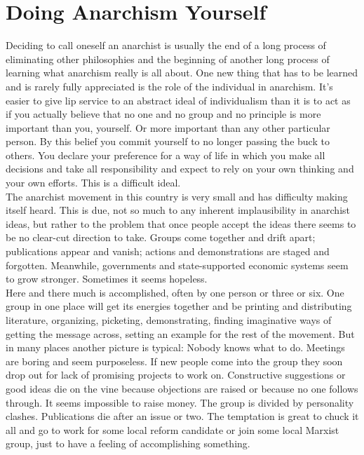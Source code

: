 \chapter{Doing Anarchism Yourself}

Deciding to call oneself an anarchist is usually the end of a long process of eliminating other philosophies and the beginning of another long process of learning what anarchism really is all about. One new thing that has to be learned and is rarely fully appreciated is the role of the individual in anarchism. It's easier to give lip service to an abstract ideal of individualism than it is to act as if you actually believe that no one and no group and no principle is more important than you, yourself. Or more important than any other particular person. By this belief you commit yourself to no longer passing the buck to others. You declare your preference for a way of life in which you make all decisions and take all responsibility and expect to rely on your own thinking and your own efforts. This is a difficult ideal.\\
The anarchist movement in this country is very small and has difficulty making itself heard. This is due, not so much to any inherent implausibility in anarchist ideas, but rather to the problem that once people accept the ideas there seems to be no clear-cut direction to take. Groups come together and drift apart; publications appear and vanish; actions and demonstrations are staged and forgotten. Meanwhile, governments and state-supported economic systems seem to grow stronger. Sometimes it seems hopeless.\\
Here and there much is accomplished, often by one person or three or six. One group in one place will get its energies together and be printing and distributing literature, organizing, picketing, demonstrating, finding imaginative ways of getting the message across, setting an example for the rest of the movement. But in many places another picture is typical: Nobody knows what to do. Meetings are boring and seem purposeless. If new people come into the group they soon drop out for lack of promising projects to work on. Constructive suggestions or good ideas die on the vine because objections are raised or because no one follows through. It seems impossible to raise money. The group is divided by personality clashes. Publications die after an issue or two. The temptation is great to chuck it all and go to work for some local reform candidate or join some local Marxist group, just to have a feeling of accomplishing something.\\
